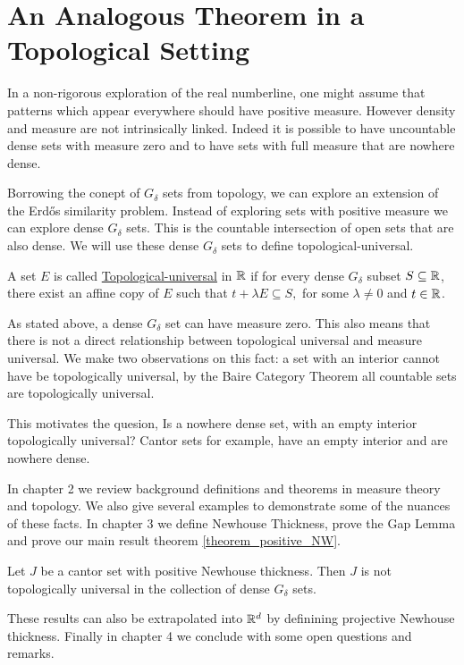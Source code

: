 \section{An Analogous Theorem in a Topological Setting}

In a non-rigorous exploration of the real numberline, one might assume that patterns which appear everywhere should have positive measure.  However density and measure are not intrinsically linked.  Indeed it is possible to have uncountable dense sets with measure zero and to have sets with full measure that are nowhere dense.  

Borrowing the conept of $G_\delta$ sets from topology, we can explore an extension of the Erd\H{o}s similarity problem.  Instead of exploring sets with positive measure we can explore dense $G_\delta$ sets.  This is the countable intersection of open sets that are also dense.  We will use these dense $G_\delta$ sets to define topological-universal. 

\begin{definition}
    A set $E$ is called \underline{Topological-universal} in $\mathbb{R}$ if for every dense $G_\delta$ subset $S \subseteq \mathbb{R}$, there exist an affine copy of $E$ such that $t+\lambda E \subseteq S,$ for some $\lambda \neq 0$ and $t \in \mathbb{R}$.  
\end{definition}

As stated above, a dense $G_\delta$ set can have measure zero.  This also means that there is not a direct relationship between topological universal and measure universal.  We make two observations on this fact: a set with an interior cannot have be topologically universal, by the Baire Category Theorem all countable sets are topologically universal.   

This motivates the quesion, Is a nowhere dense set, with an empty interior topologically universal?  Cantor sets for example, have an empty interior and are nowhere dense.  

In chapter 2 we review background definitions and theorems in measure theory and topology.  We also give several examples to demonstrate some of the nuances of these facts.  In chapter 3 we define Newhouse Thickness, prove the Gap Lemma and prove our main result theorem \ref{theorem_positive_NW}.

\begin{theorem*}
Let $J$ be a cantor set with positive Newhouse thickness.  Then $J$ is not topologically universal in the collection of dense $G_\delta$ sets.
\end{theorem*}

These results can also be extrapolated into $\mathbb{R}^d$ by definining projective Newhouse thickness.  Finally in chapter 4 we conclude with some open questions and remarks.  


